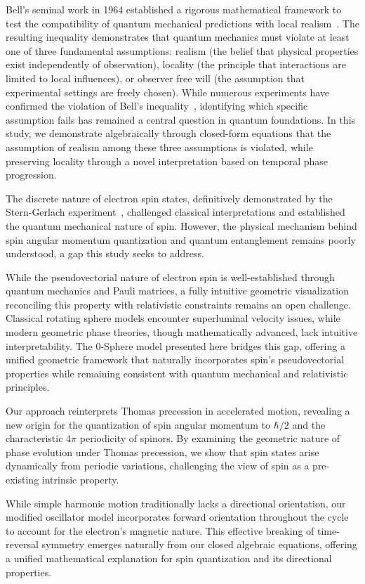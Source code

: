 \documentclass[%
 reprint,
 amsmath,amssymb,
 aps,
]{revtex4-1}
\numberwithin{equation}{section}%
\begin{document}
Bell's seminal work in 1964 established a rigorous mathematical framework to test the compatibility of quantum mechanical predictions with local realism~\cite{Bell1964}. The resulting inequality demonstrates that quantum mechanics must violate at least one of three fundamental assumptions: realism (the belief that physical properties exist independently of observation), locality (the principle that interactions are limited to local influences), or observer free will (the assumption that experimental settings are freely chosen). While numerous experiments have confirmed the violation of Bell's inequality~\cite{Aspect1982, Zeilinger2018}, identifying which specific assumption fails has remained a central question in quantum foundations. In this study, we demonstrate algebraically through closed-form equations that the assumption of realism among these three assumptions is violated, while preserving locality through a novel interpretation based on temporal phase progression.

The discrete nature of electron spin states, definitively demonstrated by the Stern-Gerlach experiment~\cite{Gerlach1922}, challenged classical interpretations and established the quantum mechanical nature of spin. However, the physical mechanism behind spin angular momentum quantization and quantum entanglement remains poorly understood, a gap this study seeks to address.


While the pseudovectorial nature of electron spin is well-established through quantum mechanics and Pauli matrices, a fully intuitive geometric visualization reconciling this property with relativistic constraints remains an open challenge. Classical rotating sphere models encounter superluminal velocity issues, while modern geometric phase theories, though mathematically advanced, lack intuitive interpretability. The 0-Sphere model presented here bridges this gap, offering a unified geometric framework that naturally incorporates spin's pseudovectorial properties while remaining consistent with quantum mechanical and relativistic principles.


Our approach reinterprets Thomas precession in accelerated motion, revealing a new origin for the quantization of spin angular momentum to $\hbar/2$ and the characteristic $4\pi$ periodicity of spinors. By examining the geometric nature of phase evolution under Thomas precession, we show that spin states arise dynamically from periodic variations, challenging the view of spin as a pre-existing intrinsic property.

While simple harmonic motion traditionally lacks a directional orientation, our modified oscillator model incorporates forward orientation throughout the cycle to account for the electron's magnetic nature. This effective breaking of time-reversal symmetry emerges naturally from our closed algebraic equations, offering a unified mathematical explanation for spin quantization and its directional properties.
\end{document}
